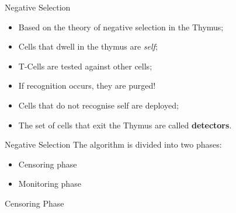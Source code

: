 \documentclass[xcolor=svgnames]{beamer}
\begin{document}
        \begin{frame}{Negative Selection}
            \begin{itemize}
                \item Based on the theory of negative selection in the Thymus;
                \item Cells that dwell in the thymus are \textit{self};
                \item T-Cells are tested against other cells;
                \item If recognition occurs, they are purged!
                \item Cells that do not recognise self are deployed;
                \item The set of cells that exit the Thymus are called \textbf{detectors}.
            \end{itemize}
        \end{frame}
        
        \begin{frame}{Negative Selection}
            The algorithm is divided into two phases:
            \vspace{1em}
            \begin{itemize}
                \item Censoring phase
                \item Monitoring phase
            \end{itemize}
        \end{frame}
        
        \begin{frame}{Censoring Phase}
            \SetEndCharOfAlgoLine{}
                \centering
        \end{frame}
        
\end{document}

